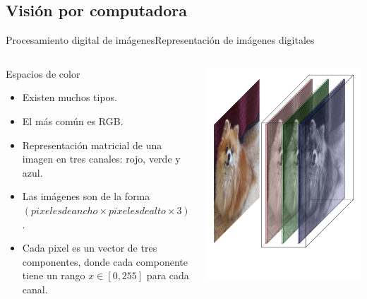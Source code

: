 \documentclass[aspectratio=169,10pt]{beamer}
\begin{document}

\subsection{Visión por computadora}

\begin{frame}{Procesamiento digital de imágenes}{Representación de imágenes digitales}
  \begin{columns}
    \begin{block}{Espacios de color}
      \begin{itemize}
        \item Existen muchos tipos.
        \item El más común es RGB.
        \item Representación matricial de una imagen en tres canales: rojo, verde y azul.
        \item Las imágenes son de la forma $ (pixeles de ancho \times pixeles de alto \times 3) $.
        \item Cada pixel es un vector de tres componentes, donde cada componente tiene un rango $ x \in [0, 255] $ para cada canal.
      \end{itemize}
    \end{block}
    \includegraphics[width=\columnwidth, height=0.9\textheight]{cachito.jpg}

\end{columns}
\end{frame}
\end{document}
